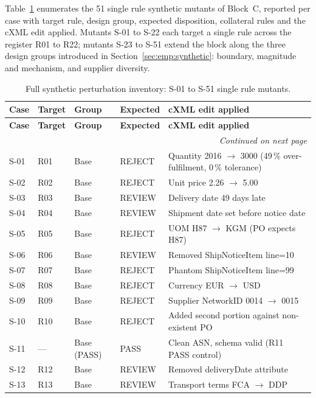 Table~\ref{tab:app:mutants_full} enumerates the 51 single rule synthetic mutants of Block~C, reported per case with target rule, design group, expected disposition, collateral rules and the cXML edit applied. Mutants S-01 to S-22 each target a single rule across the register R01 to R22; mutants S-23 to S-51 extend the block along the three design groups introduced in Section~\ref{sec:emp:synthetic}: boundary, magnitude and mechanism, and supplier diversity.

\footnotesize
\begin{longtable}{@{}llllp{6.5cm}@{}}
\caption{Full synthetic perturbation inventory: S-01 to S-51 single rule mutants.}\label{tab:app:mutants_full}\\
\toprule
\textbf{Case} & \textbf{Target} & \textbf{Group} & \textbf{Expected} & \textbf{cXML edit applied} \\
\midrule
\endfirsthead
\toprule
\textbf{Case} & \textbf{Target} & \textbf{Group} & \textbf{Expected} & \textbf{cXML edit applied} \\
\midrule
\endhead
\midrule
\multicolumn{5}{r}{\emph{Continued on next page}} \\
\endfoot
\bottomrule
\endlastfoot
S-01 & R01 & Base & REJECT & Quantity 2016 $\to$ 3000 (49\,\% over-fulfilment, 0\,\% tolerance) \\
S-02 & R02 & Base & REJECT & Unit price 2.26 $\to$ 5.00 \\
S-03 & R03 & Base & REVIEW & Delivery date 49 days late \\
S-04 & R04 & Base & REVIEW & Shipment date set before notice date \\
S-05 & R05 & Base & REJECT & UOM H87 $\to$ KGM (PO expects H87) \\
S-06 & R06 & Base & REVIEW & Removed ShipNoticeItem line=10 \\
S-07 & R07 & Base & REJECT & Phantom ShipNoticeItem line=99 \\
S-08 & R08 & Base & REJECT & Currency EUR $\to$ USD \\
S-09 & R09 & Base & REJECT & Supplier NetworkID 0014 $\to$ 0015 \\
S-10 & R10 & Base & REJECT & Added second portion against non-existent PO \\
S-11 & ---  & Base (PASS) & PASS & Clean ASN, schema valid (R11 PASS control) \\
S-12 & R12 & Base & REVIEW & Removed deliveryDate attribute \\
S-13 & R13 & Base & REVIEW & Transport terms FCA $\to$ DDP \\

\end{longtable}
